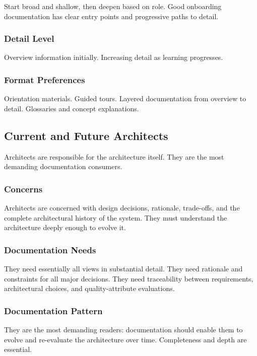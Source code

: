 \documentclass[11pt]{article}
\begin{document}
Start broad and shallow, then deepen based on role. Good onboarding documentation has clear entry points and progressive paths to detail.

\subsubsection{Detail Level}

Overview information initially. Increasing detail as learning progresses.

\subsubsection{Format Preferences}

Orientation materials. Guided tours. Layered documentation from overview to detail. Glossaries and concept explanations.

\subsection{Current and Future Architects}

Architects are responsible for the architecture itself. They are the most demanding documentation consumers.

\subsubsection{Concerns}

Architects are concerned with design decisions, rationale, trade-offs, and the complete architectural history of the system. They must understand the architecture deeply enough to evolve it.

\subsubsection{Documentation Needs}

They need essentially all views in substantial detail. They need rationale and constraints for all major decisions. They need traceability between requirements, architectural choices, and quality-attribute evaluations.

\subsubsection{Documentation Pattern}

They are the most demanding readers: documentation should enable them to evolve and re-evaluate the architecture over time. Completeness and depth are essential.
\end{document}
